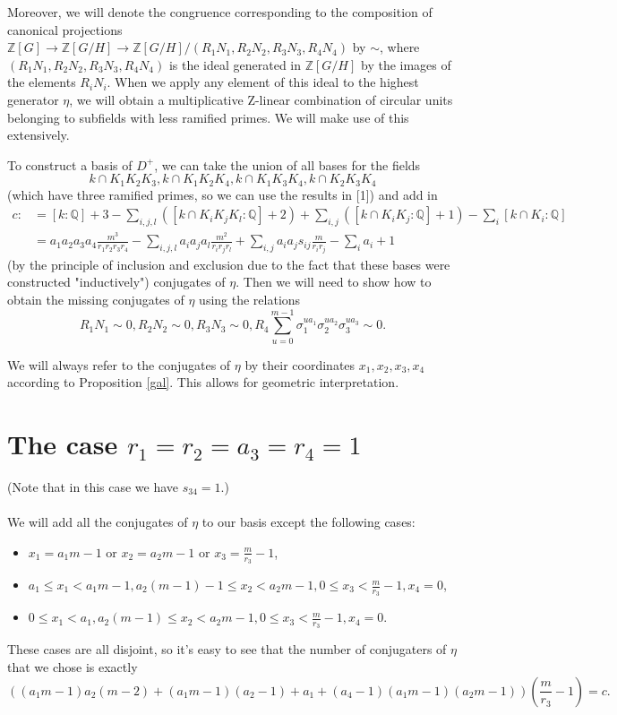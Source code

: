 \documentclass[12pt,a4paper]{article}
\newcommand{\Q}{\mathbb{Q}}
\newcommand{\Z}{\mathbb{Z}}
\begin{document}
Moreover, we will denote the congruence corresponding to the composition of canonical projections $\Z[G]\to \Z[G/H]\to \Z[G/H]/(R_1N_1,R_2N_2,R_3N_3,R_4N_4)$ by $\sim$, where $(R_1N_1,R_2N_2,R_3N_3,R_4N_4)$ is the ideal generated in $\Z[G/H]$ by the images of the elements $R_iN_i$. When we apply any element of this ideal to the highest generator $\eta$, we will obtain a multiplicative Z-linear combination of circular units belonging to subfields with less ramified primes. We will make use of this extensively.

To construct a basis of $D^+$, we can take the union of all bases for the fields $$k\cap K_1K_2K_3,k\cap K_1K_2K_4,k\cap K_1K_3K_4,k\cap K_2K_3K_4$$ (which have three ramified primes, so we can use the results in [1]) and add in
\begin{equation*}
\begin{split}
c:&=[k:\Q]+3-\sum_{i,j,l}([k\cap K_iK_jK_l:\Q]+2)+\sum_{i,j}([k\cap K_iK_j:\Q]+1)-\sum_{i}[k\cap K_i:\Q]\\&=a_1a_2a_3a_4\frac{m^3}{r_1r_2r_3r_4}-\sum_{i,j,l}a_ia_ja_l\frac{m^2}{r_ir_jr_l}+\sum_{i,j}
a_ia_js_{ij}\frac{m}{r_ir_j}-\sum_{i}a_i+1
\end{split}
\end{equation*}
(by the principle of inclusion and exclusion due to the fact that these bases were constructed "inductively") conjugates of $\eta$. Then we will need to show how to obtain the missing conjugates of $\eta$ using the relations $$R_1N_1\sim 0, R_2N_2\sim 0, R_3N_3\sim 0, R_4\sum_{u=0}^{m-1}\sigma_1^{ua_1}\sigma_2^{ua_2}\sigma_3^{ua_3}\sim 0.$$

We will always refer to the conjugates of $\eta$ by their coordinates $x_1,x_2,x_3,x_4$ according to Proposition \ref{gal}. This allows for geometric interpretation.

\section{The case $r_1=r_2=a_3=r_4=1$}
(Note that in this case we have $s_{34}=1$.) %
\paragraph*{}
We will add all the conjugates of $\eta$ to our basis except the following cases:
\begin{itemize}
\item $x_1=a_1m-1$ or $x_2=a_2m-1$ or $x_3=\frac{m}{r_3}-1$,
\item $a_1\leq x_1 < a_1m-1, a_2(m-1)-1 \leq x_2 < a_2m-1, 0\leq x_3 < \frac{m}{r_3}-1, x_4=0$,
\item $0\leq x_1 < a_1, a_2(m-1) \leq x_2 < a_2m-1, 0\leq x_3 < \frac{m}{r_3}-1, x_4=0$.
\end{itemize}
These cases are all disjoint, so it's easy to see that the number of conjugaters of $\eta$ that we chose is exactly
$$((a_1m-1)a_2(m-2)+(a_1m-1)(a_2-1)+a_1+(a_4-1)(a_1m-1)(a_2m-1))\left(\frac{m}{r_3}-1\right)=c.$$
\end{document}
